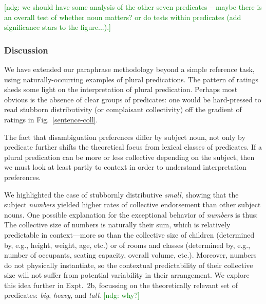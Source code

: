 \documentclass[linguex]{sp}
\newcommand{\ndg}[1]{\textcolor{Green}{[ndg: #1]}}
\begin{document}
\ndg{we should have some analysis of the other seven predicates -- maybe there is an overall test of whether noun matters? or do tests within predicates (add significance stars to the figure...).}

\subsubsection{Discussion}

We have extended our paraphrase methodology beyond a simple reference task, using naturally-occurring examples of plural predications.
The pattern of ratings sheds some light on the interpretation of plural predication. Perhaps most obvious is the absence of clear groups of predicates: one would be hard-pressed to read stubborn distributivity (or complaisant collectivity) off the gradient of ratings in Fig.~\ref{sentence-coll}.

The fact that disambiguation preferences differ by subject noun, not only by predicate further shifts the theoretical focus from lexical classes of predicates. If a plural predication can be more or less collective depending on the subject, then we must look at least partly to context in order to understand interpretation preferences.


We highlighted the case of stubbornly distributive \emph{small}, showing that the subject \emph{numbers} yielded higher rates of collective endorsement than other subject nouns. One possible explanation for the exceptional behavior of \emph{numbers} is thus: The collective size of numbers is naturally their sum, 
which is relatively predictable in context---more so than the collective size of children (determined by, e.g., height, weight, age, etc.) or of rooms and classes (determined by, e.g., number of occupants, seating capacity, overall volume, etc.). Moreover, numbers do not physically instantiate, so the contextual predictability of their collective size will not suffer from potential variability in their arrangement. 
We explore this idea further in Expt.~2b, focussing on the theoretically relevant set of predicates: \emph{big}, \emph{heavy}, and \emph{tall}. \ndg{why?}
\end{document}
